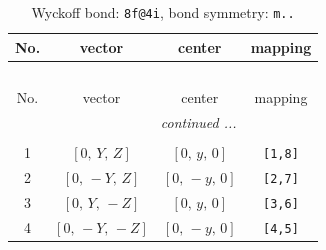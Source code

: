\documentclass[fleqn,8pt]{jsarticle}
\begin{document}
\renewcommand{\arraystretch}{1.2}
\begin{longtable}{cccc}
\caption{Wyckoff bond: {\tt 8f@4i}, bond symmetry: {\tt m..}}
 \\
 \hline \hline
No. & vector & center & mapping \\ \hline \endfirsthead

\multicolumn{3}{l}{\tablename\ \thetable{}} \\
 \hline \hline
No. & vector & center & mapping \\ \hline \endhead

 \hline \hline
\multicolumn{3}{r}{\footnotesize\it continued ...} \\ \endfoot

 \hline \hline
\multicolumn{3}{r}{} \\ \endlastfoot

1 & $\left[ 0,\, Y,\, Z \right]$ & $\left[ 0,\, y,\, 0 \right]$ & {\tt [1,8]} \\ \hline
2 & $\left[ 0,\, - Y,\, Z \right]$ & $\left[ 0,\, - y,\, 0 \right]$ & {\tt [2,7]} \\ \hline
3 & $\left[ 0,\, Y,\, - Z \right]$ & $\left[ 0,\, y,\, 0 \right]$ & {\tt [3,6]} \\ \hline
4 & $\left[ 0,\, - Y,\, - Z \right]$ & $\left[ 0,\, - y,\, 0 \right]$ & {\tt [4,5]} \\
\end{longtable}
\renewcommand{\arraystretch}{1.2}
\end{document}
